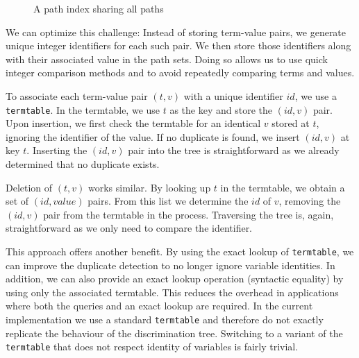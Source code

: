 \begin{figure}[h]
  \centering
{}
  \caption{A path index sharing all paths} \label{ptt_delete}
\end{figure}

We can optimize this challenge: Instead of storing term-value pairs, we generate unique integer identifiers for each such pair.
We then store those identifiers along with their associated value in the path sets. Doing so allows us to use quick integer comparison methods and to avoid repeatedly comparing terms and values.

To associate each term-value pair $(t,v)$ with a unique identifier $id$, we use a \lstinline{termtable}. In the termtable, we use $t$ as the key and store the $(id,v)$ pair. Upon insertion, we first check the termtable for an identical $v$ stored at $t$, ignoring the identifier of the value. If no duplicate is found, we insert $(id,v)$ at key $t$. Inserting the $(id,v)$ pair into the tree is straightforward as we already determined that no duplicate exists.

Deletion of $(t,v)$ works similar. By looking up $t$ in the termtable, we obtain a set of $(id,value)$ pairs. From this list we determine the $id$ of $v$, removing the $(id,v)$ pair from the termtable in the process. Traversing the tree is, again, straightforward as we only need to compare the identifier.

This approach offers another benefit. By using the exact lookup of \lstinline{termtable}, we can improve the duplicate detection to no longer ignore variable identities. In addition, we can also provide an exact lookup operation (syntactic equality) by using only the associated termtable. This reduces the overhead in applications where both the queries and an exact lookup are required. In the current implementation we use a standard \lstinline{termtable} and therefore do not exactly replicate the behaviour of the discrimination tree. Switching to a variant of the \lstinline{termtable} that does not respect identity of variables is fairly trivial.


